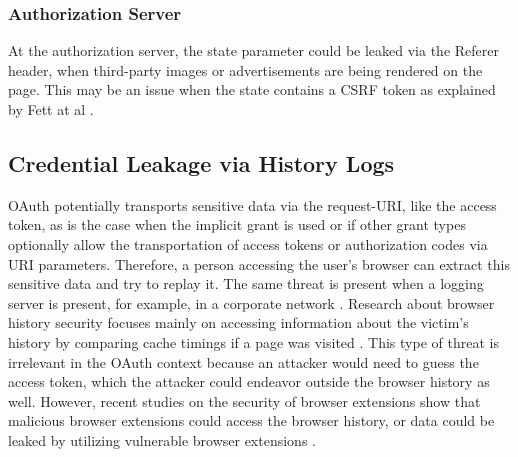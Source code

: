 \documentclass[
    fontsize=12pt,
    headings=small,
    parskip=half,           %
    bibliography=totoc,
    numbers=noenddot,       %
    open=any,               %
    ]{scrreprt}
\begin{document}
\subsubsection{Authorization Server}
At the authorization server, the state parameter could be leaked via the
Referer header, when third-party images or advertisements are being rendered on
the page. This may be an issue when the state contains a CSRF token as
explained by Fett at al \cite{fett2016comprehensive}.


\subsection{Credential Leakage via History Logs}
\label{subsec:cred_leak_browser_history}
OAuth potentially transports sensitive data via the request-URI, like the access token, as is the case when the implicit grant is used or if other grant types optionally allow the transportation of access tokens or authorization codes via URI parameters. Therefore, a person accessing the user's browser can extract this sensitive data and try to replay it. The same threat is present when a logging server is present, for example, in a corporate network \cite{lodderstedt2020oauth}. Research about browser history security focuses mainly on accessing information about the victim's history by comparing cache timings if a page was visited \cite{bansalcache}. This type of threat is irrelevant in the OAuth context because an attacker would need to guess the access token, which the attacker could endeavor outside the browser history as well. However, recent studies on the security of browser extensions show that malicious browser extensions could access the browser history, or data could be leaked by utilizing vulnerable browser extensions \cite{eriksson2022}.
\end{document}
